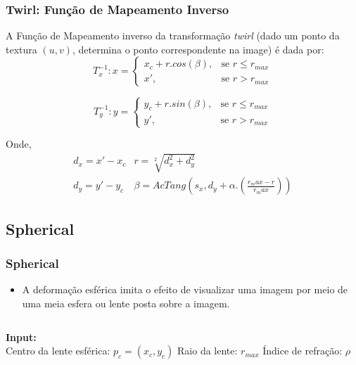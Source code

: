 \documentclass{beamer}
\begin{document}
\begin{frame}
\frametitle{Twirl: Função de Mapeamento Inverso}
A Função de Mapeamento inverso da transformação \textit{twirl} (dado um ponto da
textura $(u,v)$, determina o ponto correspondente na image) é dada por:
   \begin{equation}
    T_x^{-1}: x = 
\begin{cases}
 x_c + r.cos(\beta), & \text{se } r \leq r_{max}\\
 x', & \text{se } r > r_{max}
\end{cases}
   \end{equation}

\begin{equation}
    T_y^{-1}: y = 
\begin{cases}
 y_c + r.sin(\beta), & \text{se } r \leq r_{max} \\
 y', & \text{se } r > r_{max}
\end{cases}
\end{equation}

\pause
Onde,
\begin{equation}
\begin{array}{c|c}
d_x = x'- x_c & r = \sqrt[2]{d_x^2+d_y^2} \\
d_y =  y'- y_c & \beta = AcTang(s_x, d_y + \alpha.(\frac{r_max-r}{r_max}))
\end{array}
\end{equation}
\end{frame}

\subsection{Spherical}
\begin{frame}
 \frametitle{Spherical}
\begin{itemize}
 \item A deformação esférica imita o efeito de visualizar uma imagem por meio
de uma meia esfera ou lente posta sobre a imagem.
\end{itemize}
 
\begin{columns}[c]
\column{1.5in}
\textbf{Input:} \\
Centro da lente esférica: $p_c = (x_c, y_c)$
Raio da lente: $r_{max}$
Índice de refração: $\rho$
\column{1.5in}
\end{columns}
\end{frame}
\end{document}
